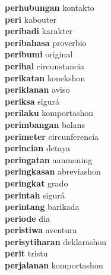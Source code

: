 \textbf{perhubungan } kontakto \\
\textbf{peri } kabouter \\
\textbf{peribadi } karakter \\
\textbf{peribahasa } proverbio \\
\textbf{peribumi } original \\
\textbf{perihal } circunstancia \\
\textbf{perikatan } konekshon \\
\textbf{periklanan } aviso \\
\textbf{periksa } sigurá \\
\textbf{perilaku } komportashon \\
\textbf{perimbangan } balans \\
\textbf{perimeter } circunferencia \\
\textbf{perincian } detaya \\
\textbf{peringatan } aanmaning \\
\textbf{peringkasan } abreviashon \\
\textbf{peringkat } grado \\
\textbf{perintah } sigurá \\
\textbf{perintang } barikada \\
\textbf{periode } dia \\
\textbf{peristiwa } aventura \\
\textbf{perisytiharan } deklarashon \\
\textbf{perit } tristu \\
\textbf{perjalanan } komportashon \\
